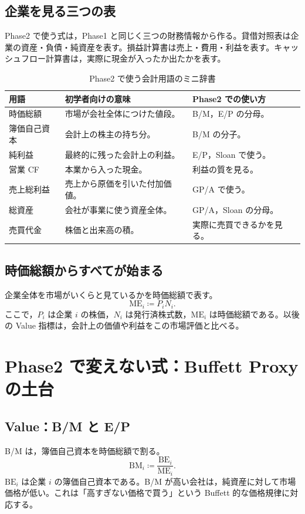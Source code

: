 \documentclass[a4paper,10pt]{article}
\newcommand{\smalltable}{\fontsize{8.7pt}{11pt}\selectfont}
\newcommand{\metric}[1]{\mathrm{#1}}
\begin{document}
\subsection{企業を見る三つの表}
Phase2 で使う式は，Phase1 と同じく三つの財務情報から作る。貸借対照表は企業の資産・負債・純資産を表す。損益計算書は売上・費用・利益を表す。キャッシュフロー計算書は，実際に現金が入ったか出たかを表す。

\begin{table}[H]
\caption{Phase2 で使う会計用語のミニ辞書}
\centering\smalltable
\begin{tabularx}{\linewidth}{p{32mm}YY}
\toprule
用語 & 初学者向けの意味 & Phase2 での使い方 \\
\midrule
時価総額 & 市場が会社全体につけた値段。 & B/M，E/P の分母。 \\
簿価自己資本 & 会計上の株主の持ち分。 & B/M の分子。 \\
純利益 & 最終的に残った会計上の利益。 & E/P，Sloan で使う。 \\
営業 CF & 本業から入った現金。 & 利益の質を見る。 \\
売上総利益 & 売上から原価を引いた付加価値。 & GP/A で使う。 \\
総資産 & 会社が事業に使う資産全体。 & GP/A，Sloan の分母。 \\
売買代金 & 株価と出来高の積。 & 実際に売買できるかを見る。 \\
\bottomrule
\end{tabularx}
\end{table}

\subsection{時価総額からすべてが始まる}
企業全体を市場がいくらと見ているかを時価総額で表す。
\begin{equation}
\metric{ME}_i \coloneqq P_i N_i .
\end{equation}
ここで，$P_i$ は企業 $i$ の株価，$N_i$ は発行済株式数，$\metric{ME}_i$ は時価総額である。以後の Value 指標は，会計上の価値や利益をこの市場評価と比べる。

\section{Phase2 で変えない式：Buffett Proxy の土台}

\subsection{Value：B/M と E/P}
B/M は，簿価自己資本を時価総額で割る。
\begin{equation}
\metric{BM}_i \coloneqq \frac{\metric{BE}_i}{\metric{ME}_i} .
\end{equation}
$\metric{BE}_i$ は企業 $i$ の簿価自己資本である。B/M が高い会社は，純資産に対して市場価格が低い。これは「高すぎない価格で買う」という Buffett 的な価格規律に対応する。
\end{document}
